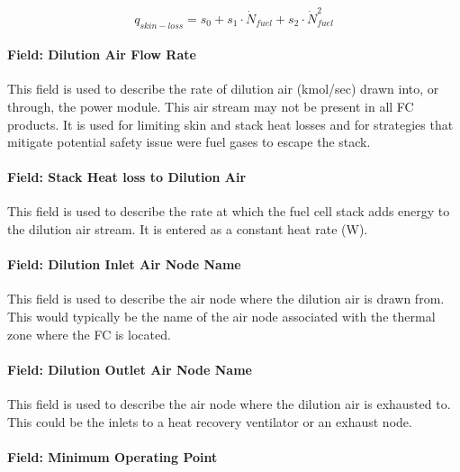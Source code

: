 \begin{equation}
{q_{skin - loss}} = {s_0} + {s_1} \cdot {\dot N_{fuel}} + {s_2} \cdot \dot N_{fuel}^2
\end{equation}

\paragraph{Field: Dilution Air Flow Rate}\label{field-dilution-air-flow-rate}

This field is used to describe the rate of dilution air (kmol/sec) drawn into, or through, the power module. This air stream may not be present in all FC products. It is used for limiting skin and stack heat losses and for strategies that mitigate potential safety issue were fuel gases to escape the stack.

\paragraph{Field: Stack Heat loss to Dilution Air}\label{field-stack-heat-loss-to-dilution-air}

This field is used to describe the rate at which the fuel cell stack adds energy to the dilution air stream. It is entered as a constant heat rate (W).

\paragraph{Field: Dilution Inlet Air Node Name}\label{field-dilution-inlet-air-node-name}

This field is used to describe the air node where the dilution air is drawn from. This would typically be the name of the air node associated with the thermal zone where the FC is located.

\paragraph{Field: Dilution Outlet Air Node Name}\label{field-dilution-outlet-air-node-name}

This field is used to describe the air node where the dilution air is exhausted to. This could be the inlets to a heat recovery ventilator or an exhaust node.

\paragraph{Field: Minimum Operating Point}\label{field-minimum-operating-point}


